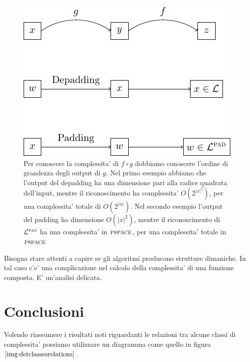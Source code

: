 \begin{figure}[!h]
    \begin{center}
        \includegraphics{./img/FunctionsComposition.pdf}
        \caption{Per conoscere la complessita' di $f \circ g$ dobbiamo conoscere l'ordine di
        grandezza degli output di $g$. Nel primo esempio abbiamo che l'output del depadding ha una
        dimensione pari alla radice quadrata dell'input, mentre il riconoscimento ha complessita'
        $O(2^{|x|^{2}})$, per una complessita' totale di $O(2^{|w|})$. Nel secondo esempio l'output
        del padding ha dimensione $O(|x|^{2})$, mentre il riconoscimento di $\mathcal{L}^{\textsc{pad}}$ ha una
        complessita' in $\textsc{pspace}$, per una complessita' totale in $\textsc{pspace}$}
    \end{center}
\end{figure}

Bisogna stare attenti a capire se gli algoritmi producono strutture dimaniche. In tal caso c'e' una
complicazione nel calcolo della complessita' di una funzione composta. E' un'analisi delicata.

\section{Conclusioni}

Volendo riassumere i risultati noti riguardanti le relazioni tra alcune classi di complessita'
possiamo utilizzare un diagramma come quello in figura $\ref{img:detclassesrelations}$. 

